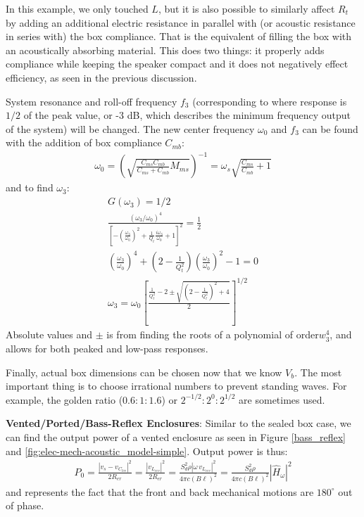 \documentclass[10pt,letterpaper]{book}
\begin{document}
In this example, we only touched $L$, but it is also possible to similarly affect $R_t$ by adding an additional electric resistance in parallel with (or acoustic resistance in series with) the box compliance. That is the equivalent of filling the box with an acoustically absorbing material. This does two things: it properly adds compliance while keeping the speaker compact and it does not negatively effect efficiency, as seen in the previous discussion.

System resonance and roll-off frequency $f_3$ (corresponding to where response is $1/2$ of the peak value, or -3 dB, which describes the minimum frequency output of the system) will be changed. The new center frequency $\omega_0$ and $f_3$ can be found with the addition of box compliance $C_{mb}$:
\begin{align}
\omega_0=\left( \sqrt{\frac{C_{ms}C_{mb}}{C_{ms}+C_{mb}}M_{ms}}  \right)^{-1}=\omega_s\sqrt{\frac{C_{ms}}{C_{mb}}+1}
\end{align}
and to find $\omega_3$:
\begin{align}
G(\omega_3)=1/2\\
\frac{(\omega_3/\omega_0 )^4}{
\left[ -\left( \frac{\omega_3}{\omega_0} \right)^2 +\frac{1}{Q_t}\frac{i\omega_3}{\omega_0}+1\right]^{2}} = \frac{1}{2}\\
\left( \frac{\omega_3}{\omega_0} \right)^4 +\left( 2 -\frac{1}{Q_t^2}\right)\left(\frac{\omega_3}{\omega_0} \right)^2-1=0\\
\omega_3=\omega_0 \left[ \frac{  \frac{1}{Q_{t}^2}-2  \pm \sqrt{\left( 2- \frac{1}{Q_{t}^2}\right)^2+4}}{2}\right]^{1/2}
\end{align}
Absolute values and $\pm$ is from finding the roots of a polynomial of order$w_3^4$, and allows for both peaked and low-pass responses.

Finally, actual box dimensions can be chosen now that we know $V_b$. The most important thing is to choose irrational numbers to prevent standing waves. For example, the golden ratio ($0.6:1:1.6$) or ${2}^{-1/2}:{2}^{0}:{2}^{1/2}$ are sometimes used.

\textbf{Vented/Ported/Bass-Reflex Enclosures}: Similar to the sealed box case, we can find the output power of a vented enclosure as seen in Figure \ref{bass_reflex} and \ref{fig:elec-mech-acoustic_model-simple}. Output power is thus:
\begin{align}
P_0=\frac{\left| v_s -v_{C_{lev}} \right|^2}{2R_{er}}=\frac{\left| v_{L_{cev}} \right|^2}{2R_{er}}=\frac{S_d^2 \rho\left| \omega \, v_{L_{cev}} \right|^2}{4\pi c (B \ell)^2}=\frac{S_d^2 \rho}{4\pi c (B \ell)^2}\left| \hat{H}_\omega \right|^2
\end{align}
and represents the fact that the front and back mechanical motions are $180^\circ$ out of phase.
\end{document}
